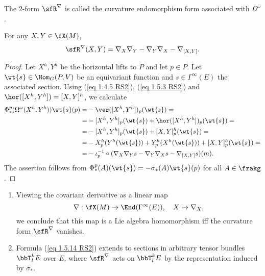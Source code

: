 \begin{defn}
    The $2$-form $\sfR^\nabla$ is called the curvature endomorphism form associated with $\Omega^\omega$.
\end{defn}

\begin{prop}[{{\cite[Prop.~1.5.11]{RS2}}}]\label{prop 1.5.11 RS2}
    For any $X,Y\in\fX(M)$,
    \[\sfR^\nabla(X,Y)=\nabla_X\nabla_Y-\nabla_Y\nabla_X-\nabla_{[X,Y]}.\label{eq 1.5.14 RS2}\]
\end{prop}
\begin{proof}
    Let $X^h,Y^h$ be the horizontal lifts to $P$ and let $p\in P$. Let $\wt{s}\in \Hom_G(P,V)$ be an equivariant function and $s\in\Gamma^\infty(E)$ the associated section. Using (\ref{eq 1.4.5 RS2}), (\ref{eq 1.5.3 RS2}) and $\hor([X^h,Y^h])=[X,Y]^h$, we calculate
    \begin{align}
        \Phi^p_\ast(\Omega^\omega(X^h,Y^h))\wt{s}(p)=&-\ver([X^h,Y^h])_p(\wt{s})=\\
        =&-[X^h,Y^h]_p(\wt{s})+\hor([X^h,Y^h])_p(\wt{s})=\\
        =&-[X^h,Y^h]_p(\wt{s})+[X,Y]^h_p(\wt{s})=\\
        =&-X^h_p(Y^h(\wt{s}))+Y^h_p(X^h(\wt{s}))+[X,Y]_p^h(\wt{s})=\\
        =&-\iota_p^{-1}\circ (\nabla_X\nabla_Y s-\nabla_Y \nabla_X s-\nabla_{[X,Y]}s)(m).
    \end{align}
    The assertion follows from $\Phi^p_\ast(A)(\wt{s})=-\sigma_\ast(A)\wt{s}(p)$ for all $A\in\frakg$.
\end{proof}


\begin{rem}\label{rem 1.5.12 RS2}
    \begin{enumerate}
        \item Viewing the covariant derivative as a linear map
        \[\nabla:\fX(M)\to \End(\Gamma^\infty(E)),\quad X\mapsto \nabla_X,\]
        we conclude that this map is a Lie algebra homomorphism iff the curvature form $\sfR^\nabla$ vanishes.
        \item Formula (\ref{eq 1.5.14 RS2}) extends to sections in arbitrary tensor bundles $\bbT^k_l E$ over $E$, where $\sfR^\nabla$ acts on $\bbT^k_l E$ by the representation induced by $\sigma_\ast$.
    \end{enumerate}
\end{rem}



